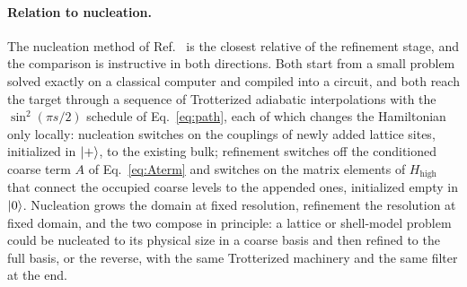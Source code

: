 \documentclass[
  aps,            %
  prc,            %
  reprint,        %
  superscriptaddress,
  floatfix,
  nofootinbib
]{revtex4-2}
\newcommand{\Hhigh}{H_{\mathrm{high}}}
\begin{document}
\paragraph{Relation to nucleation.}
The nucleation method of Ref.~\cite{Sadia2026} is the closest relative of the
refinement stage, and the comparison is instructive in both directions.  Both
start from a small problem solved exactly on a classical computer and compiled
into a circuit, and both reach the target through a sequence of Trotterized
adiabatic interpolations with the $\sin^2(\pi s/2)$ schedule of
Eq.~\eqref{eq:path}, each of which changes the Hamiltonian only locally:
nucleation switches on the couplings of newly added lattice sites, initialized
in $\ket{+}$, to the existing bulk; refinement switches off the conditioned
coarse term $A$ of Eq.~\eqref{eq:Aterm} and switches on the matrix elements of
$\Hhigh$ that connect the occupied coarse levels to the appended ones,
initialized empty in $\ket{0}$.  Nucleation grows the domain at fixed
resolution, refinement the resolution at fixed domain, and the two compose in
principle: a lattice or shell-model problem could be nucleated to its physical
size in a coarse basis and then refined to the full basis, or the reverse,
with the same Trotterized machinery and the same filter at the end.
\end{document}
